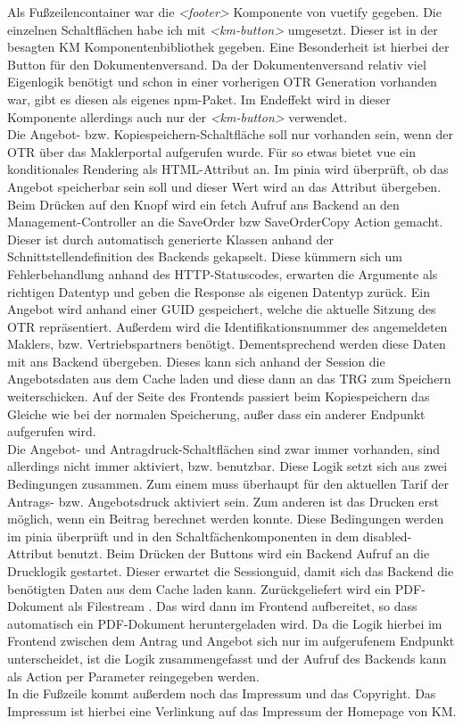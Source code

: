 Als Fußzeilencontainer war die \textit{<footer>} Komponente von \gls{vuetify} gegeben. Die einzelnen Schaltflächen habe ich mit \textit{<km-button>} umgesetzt. Dieser ist in der besagten \ac{KM} Komponentenbibliothek gegeben. Eine Besonderheit ist hierbei der Button für den Dokumentenversand. Da der Dokumentenversand relativ viel Eigenlogik benötigt und schon in einer vorherigen \ac{OTR} Generation vorhanden war, gibt es diesen als eigenes \gls{npm}-Paket. Im Endeffekt wird in dieser Komponente allerdings auch nur der \textit{<km-button>} verwendet.\\

Die Angebot- bzw. Kopiespeichern-Schaltfläche soll nur vorhanden sein, wenn der \ac{OTR} über das Maklerportal aufgerufen wurde. Für so etwas bietet \gls{vue} ein konditionales Rendering als \gls{HTML}-Attribut an. Im \gls{pinia} wird überprüft, ob das Angebot speicherbar sein soll und dieser Wert wird an das Attribut übergeben. Beim Drücken auf den Knopf wird ein \gls{fetch} Aufruf ans Backend an den Management-Controller an die SaveOrder bzw SaveOrderCopy Action  gemacht. Dieser ist durch automatisch generierte Klassen anhand der Schnittstellendefinition des Backends gekapselt. Diese kümmern sich um Fehlerbehandlung anhand des \gls{HTTP}-Statuscodes, erwarten die Argumente als richtigen Datentyp und geben die Response als eigenen Datentyp zurück. Ein Angebot wird anhand einer \ac{GUID} gespeichert, welche die aktuelle Sitzung des \ac{OTR} repräsentiert. Außerdem wird die Identifikationsnummer des angemeldeten Maklers, bzw. Vertriebspartners benötigt. Dementsprechend werden diese Daten mit ans Backend übergeben. Dieses kann sich anhand der Session die Angebotsdaten aus dem Cache laden und diese dann an das \ac{TRG} zum Speichern weiterschicken. Auf der Seite des Frontends passiert beim Kopiespeichern das Gleiche wie bei der normalen Speicherung, außer dass ein anderer Endpunkt aufgerufen wird.\\

Die Angebot- und Antragdruck-Schaltflächen sind zwar immer vorhanden, sind allerdings nicht immer aktiviert, bzw. benutzbar. Diese Logik setzt sich aus zwei Bedingungen zusammen. Zum einem muss überhaupt für den aktuellen Tarif der Antrags- bzw. Angebotsdruck aktiviert sein. Zum anderen ist das Drucken erst möglich, wenn ein Beitrag berechnet werden konnte. Diese Bedingungen werden im \gls{pinia} überprüft und in den Schaltfächenkomponenten in dem disabled-Attribut benutzt. Beim Drücken der Buttons wird ein Backend Aufruf an die Drucklogik gestartet. Dieser erwartet die Sessionguid, damit sich das Backend die benötigten Daten aus dem Cache laden kann. Zurückgeliefert wird ein PDF-Dokument als Filestream . Das wird dann im Frontend aufbereitet, so dass automatisch ein PDF-Dokument heruntergeladen wird. Da die Logik hierbei im Frontend zwischen dem Antrag und Angebot sich nur im aufgerufenem Endpunkt unterscheidet, ist die Logik zusammengefasst und der Aufruf des Backends kann als Action per Parameter reingegeben werden.\\
In die Fußzeile kommt außerdem noch das Impressum und das Copyright. Das Impressum ist hierbei eine Verlinkung auf das Impressum der Homepage von \ac{KM}.
